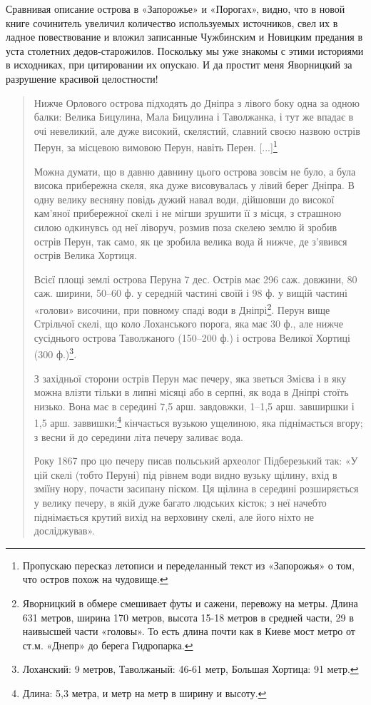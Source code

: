 Сравнивая описание острова в «Запорожье» и «Порогах», видно, что в новой книге сочинитель увеличил количество используемых источников, свел их в ладное повествование и вложил записанные Чужбинским и Новицким предания в уста столетних дедов-старожилов. Поскольку мы уже знакомы с этими историями в исходниках, при цитировании их опускаю. И да простит меня Яворницкий за разрушение красивой целостности!

\begin{quotation}
Нижче Орлового острова підходять до Дніпра з лівого боку одна за одною балки: Велика Бицулина, Мала Бицулина і Таволжанка, і тут же впадає в очі невеликий, але дуже високий, скелястий, славний своєю назвою острів Перун, за місцевою вимовою Перун, навіть Перен. [...]\footnote{Пропускаю пересказ летописи и переделанный текст из «Запорожья» о том, что остров похож на чудовище.}

Можна думати, що в давню давнину цього острова зовсім не було, а була висока прибережна скеля, яка дуже висовувалась у лівий берег Дніпра. В одну велику весняну повідь дужий навал води, дійшовши до високої кам'яної прибережної скелі і не мігши зрушити її з місця, з страшною силою одкинувсь од неї ліворуч, розмив поза скелею землю й зробив острів Перун, так само, як це зробила велика вода й нижче, де з'явився острів Велика Хортиця.

Всієї площі землі острова Перуна 7 дес. Ост\-рів має 296 саж. довжини, 80 саж. ширини, 50–60 ф. у середній частині своїй і 98 ф. у вищій частині «голови» височини, при повному спаді води в Дніпрі\footnote{Яворницкий в обмере смешивает футы и сажени, перевожу на метры. Длина 631 метров, ширина 170 метров, высота 15-18 метров в средней части, 29 в наивысшей части «головы». То есть длина почти как в Киеве мост метро от ст.м. «Днепр» до берега Гидропарка.}. Перун вище Стрільчої скелі, що коло Лоханського порога, яка має 30 ф., але нижче сусіднього острова Таволжаного (150–200 ф.) і острова Великої Хортиці (300 ф.)\footnote{Лоханский: 9 метров, Таволжаный: 46-61 метр, Большая Хортица: 91 метр.}.

З західньої сторони острів Перун має печеру, яка зветься Змієва і в яку можна влізти тільки в липні місяці або в серпні, як вода в Дніпрі стоїть низько. Вона має в середині 7,5 арш. завдовжки, 1–1,5 арш. завширшки і 1,5 арш. заввишки;\footnote{Длина: 5,3 метра, и метр на метр в ширину и высоту.} кінчається вузькою ущелиною, яка піднімається вгору; з весни й до середини літа печеру заливає вода.

Року 1867 про цю печеру писав польський археолог Підберезький так: «У цій скелі (тобто Перуні) під рівнем води видно вузьку щілину, вхід в зміїну нору, почасти засипану піском. Ця щілина в середині розширяється у велику печеру, в якій дуже багато людських кісток; з неї начебто піднімається крутий вихід на верховину скелі, але його ніхто не досліджував».


\end{quotation}
